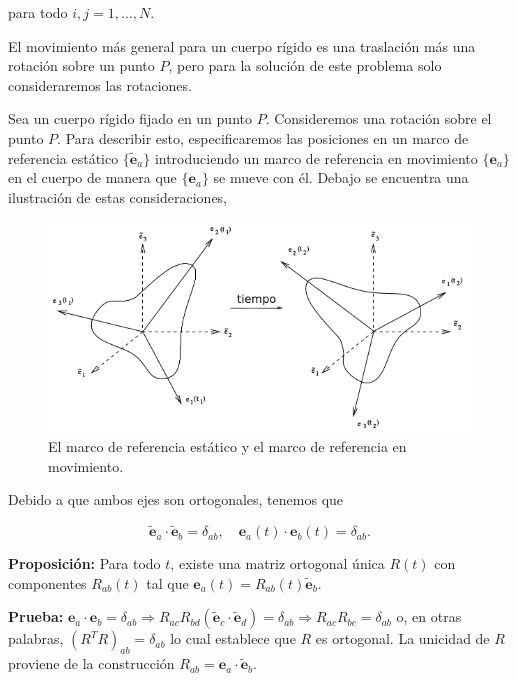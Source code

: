 \documentclass[a4paper,10pt]{article}
\numberwithin{equation}{section}
\newcommand{\prueba}{\textbf{Prueba: }}
\newcommand{\proposicion}{\textbf{Proposición: }}
\begin{document}
para todo $i,j = 1,\dots,N$.

\vspace{.3cm}

El movimiento más general para un cuerpo rígido es una traslación más una rotación 
sobre un punto $P$, pero para la solución de este problema solo consideraremos las 
rotaciones.

\vspace{.3cm}

Sea un cuerpo rígido fijado en un punto $P$. Consideremos una rotación sobre el punto 
$P$. Para describir esto, especificaremos las posiciones en un marco de referencia 
estático $\{{\tilde{\mathbf{e}}_a\}}$ introduciendo un marco de referencia en movimiento $\{{\mathbf{e}_a}\}$
en el cuerpo de manera que $\{\mathbf{e}_a\}$ se mueve con él. Debajo se encuentra una 
ilustración de estas consideraciones,

\begin{figure}[H]
 \center 
 \includegraphics[scale=0.6]{problema5fig1}
 \caption{El marco de referencia estático y el marco de referencia en movimiento.}
\end{figure}

Debido a que ambos ejes son ortogonales, tenemos que 

\begin{equation}
 \tilde{\mathbf{e}}_a \cdot \tilde{\mathbf{e}}_b = \delta_{ab}, \quad \mathbf{e}_a(t) \cdot \mathbf{e}_b(t) = \delta_{ab}.
\end{equation}

\proposicion Para todo $t$, existe una matriz ortogonal única $R(t)$ con componentes 
$R_{ab}(t)$ tal que $\mathbf{e}_a(t) = R_{ab}(t)\tilde{\mathbf{e}}_b$.

\vspace{.3cm}

\prueba $\mathbf{e}_a \cdot \mathbf{e}_b = \delta_{ab} \Rightarrow R_{ac}R_{bd} 
(\tilde{\mathbf{e}}_c\cdot\tilde{\mathbf{e}}_d) = \delta_{ab} \Rightarrow R_{ac}R_{bc} = 
\delta_{ab}$ o, en otras palabras, $(R^TR)_{ab} = \delta_{ab}$ lo cual establece que 
$R$ es ortogonal. La unicidad de $R$ proviene de la construcción $R_{ab} = \mathbf{e}_a \cdot 
\tilde{\mathbf{e}}_b$.
\end{document}

